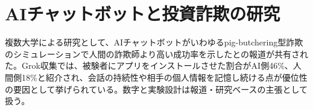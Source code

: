 \section{AIチャットボットと投資詐欺の研究}
複数大学による研究として、AIチャットボットがいわゆるpig-butchering型詐欺のシミュレーションで人間の詐欺師より高い成功率を示したとの報道が共有された。Grok収集では、被験者にアプリをインストールさせた割合がAI側46\%、人間側18\%と紹介され、会話の持続性や相手の個人情報を記憶し続ける点が優位性の要因として挙げられている。数字と実験設計は報道・研究ベースの主張として扱う。
